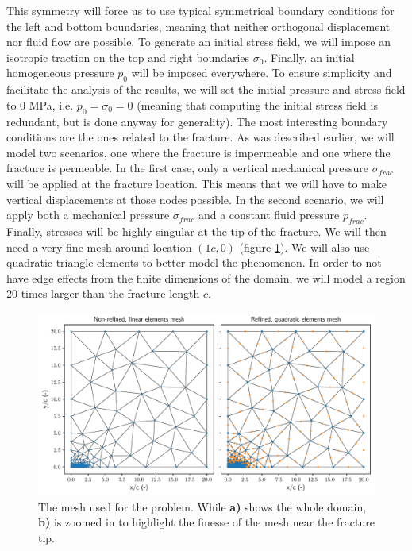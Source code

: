 \documentclass{article}
\begin{document}
This symmetry will force us to use typical symmetrical boundary conditions for the left and bottom boundaries, meaning that neither orthogonal displacement nor fluid flow are possible. To generate an initial stress field, we will impose an isotropic traction on the top and right boundaries $\sigma_0$. Finally, an initial homogeneous pressure $p_0$ will be imposed everywhere. To ensure simplicity and facilitate the analysis of the results, we will set the initial pressure and stress field to 0 MPa, i.e. $p_0=\sigma_0=0$ (meaning that computing the initial stress field is redundant, but is done anyway for generality). The most interesting boundary conditions are the ones related to the fracture. As was described earlier, we will model two scenarios, one where the fracture is impermeable and one where the fracture is permeable. In the first case, only a vertical mechanical pressure $\sigma_{frac}$ will be applied at the fracture location. This means that we will have to make vertical displacements at those nodes possible. In the second scenario, we will apply both a mechanical pressure $\sigma_{frac}$ and a constant fluid pressure $p_{frac}$. Finally, stresses will be highly singular at the tip of the fracture. We will then need a very fine mesh around location $(1c, 0)$ (figure \ref{fig:domain}). We will also use quadratic triangle elements to better model the phenomenon. In order to not have edge effects from the finite dimensions of the domain, we will model a region 20 times larger than the fracture length $c$.

\begin{figure}[h]
    \centering
    \includegraphics[width=1\textwidth]{../figures/mesh}
    \caption{The mesh used for the problem. While \textbf{a)} shows the whole domain, \textbf{b)} is zoomed in to highlight the finesse of the mesh near the fracture tip.}
    \label{fig:domain}
\end{figure}
\end{document}
